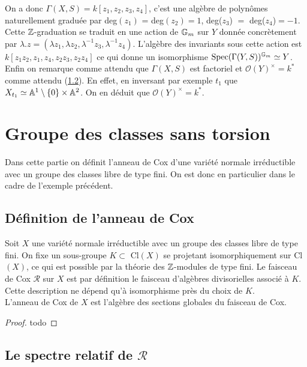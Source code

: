 On a donc $\Gamma(X, S)=k[z_1,z_2,z_3,z_4]$, c'est une algèbre de polynômes naturellement graduée par deg$(z_1)$ = deg$(z_2)=1$, deg($z_3$) $=$ deg($z_4$)$=-1$. Cette $\mathbb{Z}$-graduation se traduit en une action de $\mathbb{G}_m$ sur $Y$ donnée  concrètement par $\lambda.z=(\lambda z_1,\lambda z_2,\lambda^{-1} z_3,\lambda^{-1} z_4)$. L'algèbre des invariants sous cette action est $k[z_1z_2,z_1,z_4,z_2z_3,z_2z_4]$ ce qui donne un isomorphisme $\operatorname{Spec}(\Gamma(Y,S))^{\mathbb{G}_m}\simeq Y$. 
Enfin on remarque comme attendu que $\Gamma(X, S)$ est factoriel et $\mathcal{O}(Y)^{\times}=k^*$ comme attendu (\ref{}). En effet, en inversant par exemple $t_1$  que $X_{t_1}\simeq \mathbb{A}^{1}\setminus \lbrace0\rbrace\times\mathbb{A}^{2}$. On en déduit que $\mathcal{O}(Y)^{\times}=k^*$.

 

\section{Groupe des classes sans torsion}

Dans cette partie on définit l'anneau de Cox d'une variété normale irréductible avec un groupe des classes libre de type fini. On est donc en particulier dans le cadre de l'exemple précédent.

\subsection{Définition de l'anneau de Cox}

\begin{cons}
Soit $X$ une variété normale irréductible avec un groupe des classes libre de type fini. On fixe un sous-groupe $K\subset $ Cl$(X)$ se projetant isomorphiquement sur Cl$(X)$, ce qui est possible par la théorie des $\mathbb{Z}$-modules de type fini. Le faisceau de Cox $\mathcal{R}$ sur $X$ est par définition le faisceau d'algèbres divisorielles associé à $K$. Cette description ne dépend qu'à isomorphisme près du choix de $K$.\\
L'anneau de Cox de $X$ est l'algèbre des sections globales du faisceau de Cox. 
\end{cons}
\begin{proof}
todo
\end{proof}



\subsection{Le spectre relatif de $\mathcal{R}$}

